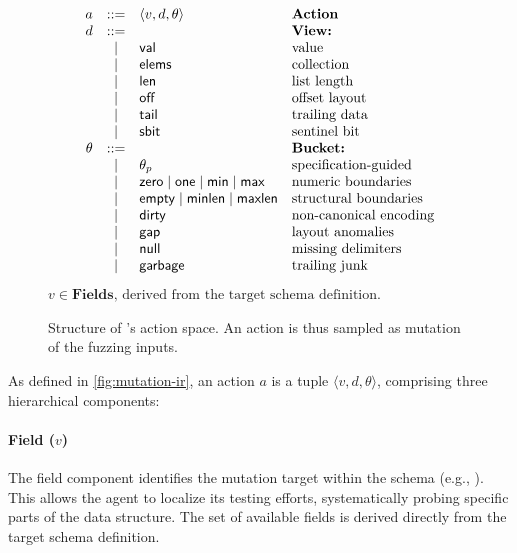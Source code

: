 \begin{figure}[t]
    \centering
    \small
     \[
        \begin{array}{r c l l}
            a & ::=  & \langle v,d,\theta \rangle & \textbf{Action}\\
            d & ::=  & & \textbf{View:} \\
              & \mid & {\sf val} & \text{value} \\
              & \mid & {\sf elems} & \text{collection} \\
              & \mid & {\sf len} & \text{list length} \\
              & \mid & {\sf off} & \text{offset layout} \\
              & \mid & {\sf tail} & \text{trailing data} \\
              & \mid & {\sf sbit} & \text{sentinel bit} \\
       \theta & ::=  & & \textbf{Bucket:} \\
              & \mid & \theta_p & \text{specification-guided} \\
              & \mid & {\sf zero} \mid {\sf one} \mid {\sf min} \mid {\sf max} & \text{numeric boundaries} \\
              & \mid & {\sf empty} \mid {\sf minlen} \mid {\sf maxlen} & \text{structural boundaries} \\
              & \mid & {\sf dirty} & \text{non-canonical encoding} \\
              & \mid & {\sf gap} & \text{layout anomalies} \\
              & \mid & {\sf null} & \text{missing delimiters} \\
              & \mid & {\sf garbage} & \text{trailing junk} \\
        \end{array}
    \]
    $v \in \textbf{Fields}\text{, derived from the target schema definition.}$
    \caption{Structure of \tool's action space. An action is thus sampled as mutation of the fuzzing inputs.}
    \label{fig:mutation-ir}
\end{figure}

As defined in \autoref{fig:mutation-ir}, an action $a$ is a tuple $\langle v, d, \theta \rangle$, comprising three hierarchical components:

\paragraph{Field ($v$)}
The field component identifies the mutation target within the schema (e.g., ). This allows the agent to localize its testing efforts, systematically probing specific parts of the data structure. The set of available fields is derived directly from the target schema definition.

